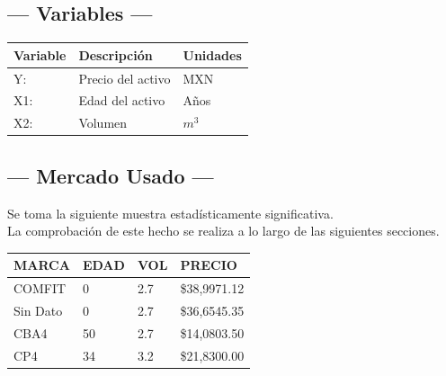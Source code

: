 \subsection{\centering --- Variables ---} %
\begin{center}
  \begin{tabular}{|l|l|l|}
    \hline 
    Variable & Descripción   & Unidades\\ \hline 
    Y:  & Precio del activo  & MXN \\ \hline 
    X1: & Edad del activo    & Años \\ \hline 
		X2: & Volumen  & \(m ^ 3\) \\ \hline 
  \end{tabular}
\end{center} 

\subsection{\centering --- Mercado Usado ---} %
Se toma la siguiente muestra estadísticamente significativa. \\ 
La comprobación de este hecho se realiza a lo largo de las siguientes secciones.
\begin{center}
	\begin{tabular}{*{4}{|p{2cm}}|}
		\hline 
MARCA    & EDAD  & VOL  & PRECIO \\ \hline
COMFIT   & 0     & 2.7  & \$38,9971.12 \\ \hline
Sin Dato & 0     & 2.7  & \$36,6545.35 \\ \hline
CBA4     & 50    & 2.7  & \$14,0803.50 \\ \hline
CP4      & 34    & 3.2  & \$21,8300.00 \\ \hline
	\end{tabular}
\end{center}

